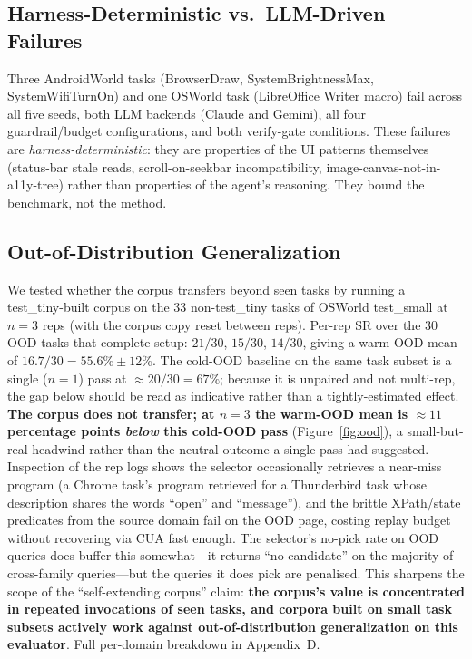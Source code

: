 \documentclass[11pt]{article}
\begin{document}
\subsection{Harness-Deterministic vs.\ LLM-Driven Failures}
\label{sec:disc-harness-det}

Three AndroidWorld tasks (BrowserDraw, SystemBrightnessMax, SystemWifiTurnOn) and one OSWorld task (LibreOffice Writer macro) fail across all five seeds, both LLM backends (Claude and Gemini), all four guardrail/budget configurations, and both verify-gate conditions. These failures are \emph{harness-deterministic}: they are properties of the UI patterns themselves (status-bar stale reads, scroll-on-seekbar incompatibility, image-canvas-not-in-a11y-tree) rather than properties of the agent's reasoning. They bound the benchmark, not the method.

\subsection{Out-of-Distribution Generalization}
\label{sec:eval-ood}

We tested whether the corpus transfers beyond seen tasks by running a test\_tiny-built corpus on the 33 non-test\_tiny tasks of OSWorld test\_small at $n{=}3$ reps (with the corpus copy reset between reps). Per-rep SR over the 30 OOD tasks that complete setup: $21/30$, $15/30$, $14/30$, giving a warm-OOD mean of $16.7/30 = 55.6\% \pm 12\%$. The cold-OOD baseline on the same task subset is a single ($n{=}1$) pass at $\approx 20/30 = 67\%$; because it is unpaired and not multi-rep, the gap below should be read as indicative rather than a tightly-estimated effect. \textbf{The corpus does not transfer; at $n{=}3$ the warm-OOD mean is $\approx 11$ percentage points \emph{below} this cold-OOD pass} (Figure~\ref{fig:ood}), a small-but-real headwind rather than the neutral outcome a single pass had suggested. Inspection of the rep logs shows the selector occasionally retrieves a near-miss program (a Chrome task's program retrieved for a Thunderbird task whose description shares the words ``open'' and ``message''), and the brittle XPath/state predicates from the source domain fail on the OOD page, costing replay budget without recovering via CUA fast enough. The selector's no-pick rate on OOD queries does buffer this somewhat---it returns ``no candidate'' on the majority of cross-family queries---but the queries it does pick are penalised. This sharpens the scope of the ``self-extending corpus'' claim: \textbf{the corpus's value is concentrated in repeated invocations of seen tasks, and corpora built on small task subsets actively work against out-of-distribution generalization on this evaluator}. Full per-domain breakdown in Appendix~D.
\end{document}
